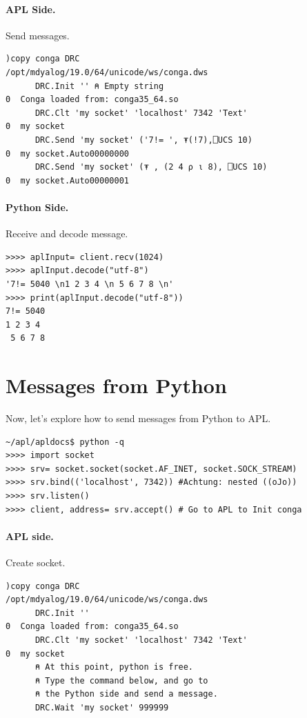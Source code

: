 \documentclass[a4paper,12pt]{book}
\begin{document}
\paragraph{APL Side.} Send messages.
\begin{lstlisting}[language=apl]
     )copy conga DRC
/opt/mdyalog/19.0/64/unicode/ws/conga.dws
      DRC.Init '' ⍝ Empty string
0  Conga loaded from: conga35_64.so
      DRC.Clt 'my socket' 'localhost' 7342 'Text'
0  my socket
      DRC.Send 'my socket' ('7!= ', ⍕(!7),⎕UCS 10)
0  my socket.Auto00000000
      DRC.Send 'my socket' (⍕ , (2 4 ⍴ ⍳ 8), ⎕UCS 10)
0  my socket.Auto00000001
\end{lstlisting}

\paragraph{Python Side.} Receive and decode message.
\begin{verbatim}
>>>> aplInput= client.recv(1024)
>>>> aplInput.decode("utf-8")
'7!= 5040 \n1 2 3 4 \n 5 6 7 8 \n'
>>>> print(aplInput.decode("utf-8"))
7!= 5040 
1 2 3 4 
 5 6 7 8 
\end{verbatim}

\section{Messages from Python}
Now, let's explore how to send messages from Python to APL.
\begin{verbatim}
~/apl/apldocs$ python -q
>>>> import socket
>>>> srv= socket.socket(socket.AF_INET, socket.SOCK_STREAM)
>>>> srv.bind(('localhost', 7342)) #Achtung: nested ((oJo))
>>>> srv.listen()
>>>> client, address= srv.accept() # Go to APL to Init conga
\end{verbatim}

\paragraph{APL side.} Create socket.
\begin{lstlisting}[language=apl]
     )copy conga DRC
/opt/mdyalog/19.0/64/unicode/ws/conga.dws
      DRC.Init ''
0  Conga loaded from: conga35_64.so
      DRC.Clt 'my socket' 'localhost' 7342 'Text'
0  my socket
      ⍝ At this point, python is free.
      ⍝ Type the command below, and go to
      ⍝ the Python side and send a message.
      DRC.Wait 'my socket' 999999
\end{lstlisting}
\end{document}
